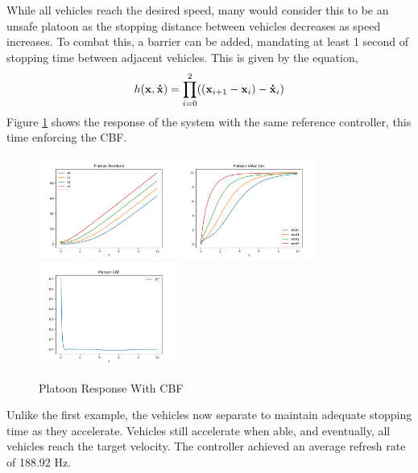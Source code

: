 \noindent While all vehicles reach the desired speed, many would consider this to be an unsafe platoon as the stopping distance between vehicles decreases as speed increases. To combat this, a barrier can be added, mandating at least 1 second of stopping time between adjacent vehicles. This is given by the equation,
\begin{align*}
    h({\mathbf{{x}}}, {\mathbf{\dot{x}}}) = \prod_{i = 0}^2 (({\mathbf{{x}}}_{i + 1} - {\mathbf{{x}}}_i) -  {\mathbf{\dot{x}}}_i)
\end{align*}
\noindent Figure \ref{fig:platoon_cbf} shows the response of the system with the same reference controller, this time enforcing the CBF.
\begin{figure}[H]
    \centering
    \includegraphics[width=0.4\textwidth]{Figures/Examples/Platoon/Positions.png}
    \includegraphics[width=0.4\textwidth]{Figures/Examples/Platoon/Velocities.png}
    \includegraphics[width=0.4\textwidth]{Figures/Examples/Platoon/CBF.png}
    \caption{Platoon Response With CBF}
    \label{fig:platoon_cbf}
\end{figure}
\noindent Unlike the first example, the vehicles now separate to maintain adequate stopping time as they accelerate. Vehicles still accelerate when able, and eventually, all vehicles reach the target velocity. The controller achieved an average refresh rate of 188.92 Hz.

